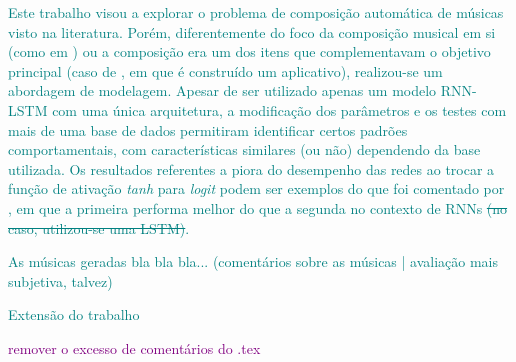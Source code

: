 \documentclass{automatextcc}
\newcommand{\obs}[1]{\textcolor{purple}{#1}}
\newcommand{\nico}[1]{\textcolor{teal}{#1}}
\begin{document}
\nico{ %
Este trabalho visou a explorar o problema de composição automática de músicas visto na literatura. Porém, diferentemente do foco da composição musical em si (como em \citet{agarwala2017}) ou a composição era um dos itens que complementavam o objetivo principal (caso de \citet{souza2018}, em que é construído um aplicativo), realizou-se um abordagem de modelagem. Apesar de ser utilizado apenas um modelo RNN-LSTM com uma única arquitetura, a modificação dos parâmetros e os testes com mais de uma base de dados permitiram identificar certos padrões comportamentais, com características similares (ou não) dependendo da base utilizada. Os resultados referentes a piora do desempenho das redes ao trocar a função de ativação \textit{tanh} para \textit{logit} podem ser exemplos do que foi comentado por \citet{goodfellow2016}, em que a primeira performa melhor do que a segunda no contexto de RNNs \sout{(no caso, utilizou-se uma LSTM)}. 
}

\nico{
As músicas geradas bla bla bla... (comentários sobre as músicas | avaliação mais subjetiva, talvez)
}

\nico{
Extensão do trabalho
}

\obs{remover o excesso de comentários do .tex}





\end{document}
